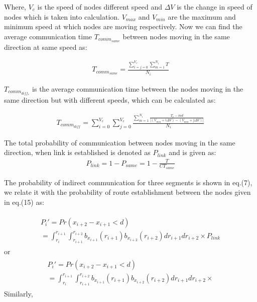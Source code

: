 \documentclass[journal]{IEEEtran}
\begin{document}
Where, $V_{c}$ is the speed of nodes different speed and $\Delta{V}$ is the change in speed of nodes which is taken into calculation. $V_{max}$ and $V_{min}$ are the maximum and minimum speed at which nodes are moving respectively. Now we can find the average communication time $ T_{comm_{same}}$ between nodes moving in the same direction at same speed as:

\begin{eqnarray}
T_{comm_{same}}=\frac{\sum_{i=j=0}^{V_{c}}\sum_{m=1}^{N_{i}}T}{N_{i}}
\end{eqnarray}

$ T_{comm_{diff_{s}}}$ is the average communication time between the nodes moving in the same direction but with different speeds, which can be calculated as:

\tiny
\begin{eqnarray}
T_{comm_{diff}}=\sum_{i=0}^{V_{c}}\sum_{j=0}^{V_{c}}\frac{\sum_{m=1}^{N_{i}}\frac{T_{r}-md}{|{(V_{min}+i\Delta{V})-(V_{min}+j\Delta{V})}|}}{N_{i}}
\end{eqnarray}

\normalsize
The total probability of communication between nodes moving in the same direction, when link is established is denoted as $P_{link}$ and is given as:
\begin{eqnarray}
P_{link}=1-P_{same}=1-\frac{T}{CT_{same}}
\end{eqnarray}

The probability of indirect communication for three segments is shown in eq.(7), we relate it with the probability of route establishment between the nodes given in eq.(15) as:

\tiny
\begin{eqnarray}
\begin{split}
P_{i}'=Pr(x_{i+2}-x_{i+1}<d)\\
=\int_{r_{i}}^{r_{i+1}}\int_{r_{i+1}}^{r_{i+2}}b_{x_{i+1}}(r_{i+1})b_{x_{i+2 }}(r_{i+2})dr_{i+1}dr_{i+2} \times P_{link}
\end{split}
\end{eqnarray}
\normalsize
or
\tiny
\begin{eqnarray}
\begin{split}
P_{i}'=Pr(x_{i+2}-x_{i+1}<d)
\\=\int_{r_{i}}^{r_{i+1}}\int_{r_{i+1}}^{r_{i+2}}b_{x_{i+1}}(r_{i+1})b_{x_{i+2 }}(r_{i+2})dr_{i+1}dr_{i+2} \times \end{split}
\end{eqnarray}
\normalsize
Similarly,
\end{document}
